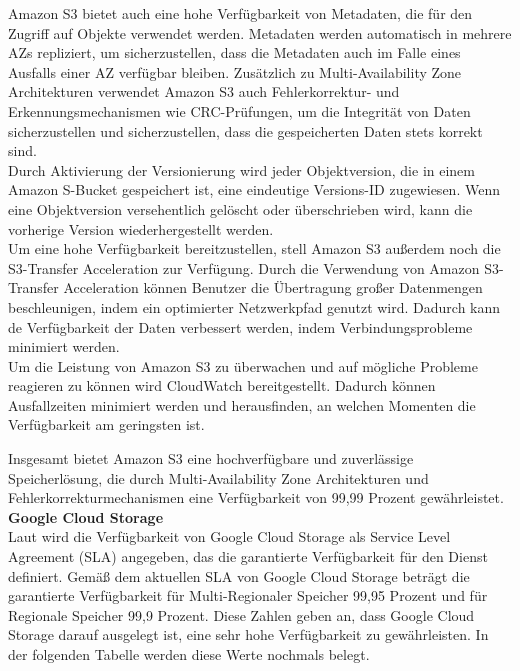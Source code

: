 Amazon S3 bietet auch eine hohe Verfügbarkeit von Metadaten, die für den Zugriff auf Objekte verwendet werden. Metadaten werden automatisch in mehrere AZs repliziert, um sicherzustellen, dass die Metadaten auch im Falle eines Ausfalls einer AZ verfügbar bleiben. Zusätzlich zu Multi-Availability Zone Architekturen verwendet Amazon S3 auch Fehlerkorrektur- und Erkennungsmechanismen wie CRC-Prüfungen, um die Integrität von Daten sicherzustellen und sicherzustellen, dass die gespeicherten Daten stets korrekt sind.\\

Durch Aktivierung der Versionierung wird jeder Objektversion, die in einem Amazon S-Bucket gespeichert ist, eine eindeutige Versions-ID zugewiesen. Wenn eine Objektversion versehentlich gelöscht oder überschrieben wird, kann die vorherige Version wiederhergestellt werden.\\

Um eine hohe Verfügbarkeit bereitzustellen, stell Amazon S3 außerdem noch die S3-Transfer Acceleration zur Verfügung. Durch die Verwendung von Amazon S3-Transfer Acceleration können Benutzer die Übertragung großer Datenmengen beschleunigen, indem ein optimierter Netzwerkpfad genutzt wird. Dadurch kann de Verfügbarkeit der Daten verbessert werden, indem Verbindungsprobleme minimiert werden.\\

Um die Leistung von Amazon S3 zu überwachen und auf mögliche Probleme reagieren zu können wird CloudWatch bereitgestellt. Dadurch können Ausfallzeiten minimiert werden und herausfinden, an welchen Momenten die Verfügbarkeit am geringsten ist.

Insgesamt bietet Amazon S3 eine hochverfügbare und zuverlässige Speicherlösung, die durch Multi-Availability Zone Architekturen und Fehlerkorrekturmechanismen eine Verfügbarkeit von 99,99 Prozent gewährleistet.\\


\textbf{Google Cloud Storage}\\

Laut \cite{gcp-sla} wird die Verfügbarkeit von Google Cloud Storage als Service Level Agreement (SLA) angegeben, das die garantierte Verfügbarkeit für den Dienst definiert. Gemäß dem aktuellen SLA von Google Cloud Storage beträgt die garantierte Verfügbarkeit für Multi-Regionaler Speicher 99,95 Prozent und für Regionale Speicher 99,9 Prozent. Diese Zahlen geben an, dass Google Cloud Storage darauf ausgelegt ist, eine sehr hohe Verfügbarkeit zu gewährleisten. In der folgenden Tabelle werden diese Werte nochmals belegt.

